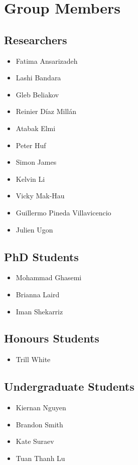 \chapter*{Group Members}
\section*{Researchers}
\begin{itemize}
\item Fatima Ansarizadeh
\item Lashi Bandara
\item Gleb Beliakov
\item Reinier Díaz Millán
\item Atabak Elmi
\item Peter Huf
\item Simon James
\item Kelvin Li
\item Vicky Mak-Hau
\item Guillermo Pineda Villavicencio
\item Julien Ugon
\end{itemize}
\section*{PhD Students}
\begin{itemize}
\item Mohammad Ghasemi
\item Brianna Laird
\item Iman Shekarriz
\end{itemize}
\section*{Honours Students}
\begin{itemize}
\item Trill White
\end{itemize}
\section*{Undergraduate Students}
\begin{itemize}
\item Kiernan Nguyen 
\item Brandon Smith
\item Kate Suraev
\item Tuan Thanh Lu
\end{itemize}
